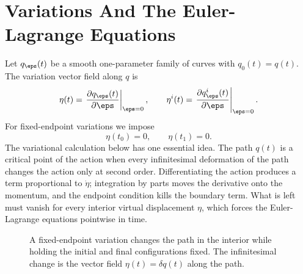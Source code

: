 \section{Variations And The Euler-Lagrange Equations}
\label{sec:euler-lagrange}

Let \(q_\eps(t)\) be a smooth one-parameter family of curves with
\(q_0(t)=q(t)\). The variation vector field along \(q\) is
\[
  \eta(t)=\left.\frac{\partial q_\eps(t)}{\partial \eps}\right|_{\eps=0},
  \qquad
  \eta^i(t)=\left.\frac{\partial q_\eps^i(t)}{\partial \eps}\right|_{\eps=0}.
\]
For fixed-endpoint variations we impose
\[
  \eta(t_0)=0,\qquad \eta(t_1)=0.
\]
The variational calculation below has one essential idea. The path \(q(t)\) is
a critical point of the action when every infinitesimal deformation of the path
changes the action only at second order. Differentiating the action produces a
term proportional to \(\dot\eta\); integration by parts moves the derivative
onto the momentum, and the endpoint condition kills the boundary term. What is
left must vanish for every interior virtual displacement \(\eta\), which forces
the Euler-Lagrange equations pointwise in time.

\begin{figure}[htbp]
\centering
{}
\caption{A fixed-endpoint variation changes the path in the interior while
holding the initial and final configurations fixed. The infinitesimal change is
the vector field \(\eta(t)=\delta q(t)\) along the path.}
\label{fig:fixed-endpoint-variation}
\end{figure}


